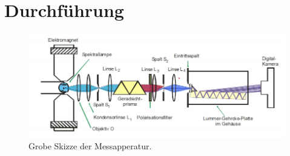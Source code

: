 \section{Durchführung}
\label{sec:Durchführung}




\begin{figure}
    \centering
    \includegraphics[width=\textwidth]{images/aufbau1.png}
    \caption{Grobe Skizze der Messapperatur. \cite{V27}}
    \label{fig:aufbau}
\end{figure}


